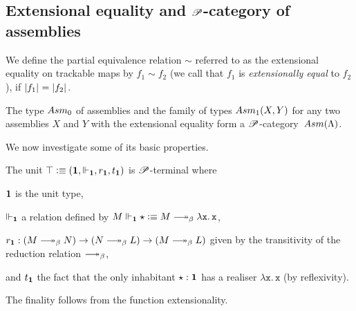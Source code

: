\documentclass[a4paper,UKenglish,numberwithinsect,cleveref,thm-restate]{lipics-v2021}
\numberwithin{equation}{section}
\theoremstyle{definition}
\theoremstyle{plain}
\begin{document}



\subsection{Extensional equality and \texorpdfstring{$\mathscr{P}$}{P}-category of assemblies}

We define the partial equivalence relation $\sim$ referred to as the extensional equality on trackable maps by $f_1 \sim f_2$ (we call that $f_1$ is \emph{extensionally equal} to $f_2$), if $\mathopen{}\left|f_1\right|_{}^{}\mathclose{} = \mathopen{}\left|f_2\right|_{}^{}\mathclose{}$.
\begin{proposition}
  The type $\Asm_0$ of assemblies and the family of types $\Asm_1(X, Y)$ for any two assemblies $X$ and $Y$ with the extensional equality form a $\mathscr{P}$-category~$\Asm(\Lambda)$.
\end{proposition}

We now investigate some of its basic properties.

\begin{example}
  The unit $\top \vcentcolon\equiv (\mathbf{1}, \Vdash_{\mathbf{1}}, r_{\mathbf{1}}, t_{\mathbf{1}})$ is $\mathscr{P}$-terminal where 
  \begin{romanenumerate}
    \item $\mathbf{1}$ is the unit type,  
    \item $\Vdash_{\mathbf{1}}$ a relation defined by $M \Vdash_{\Unit} \star \defeq M \reduce \mathtt{\lambda x.\, x}$, 
    \item $r_{\Unit}: (M \reduce N) \to (N \reduce L) \to (M \reduce L)$ given by the transitivity of the reduction relation $\reduce$,
    \item and $t_{\mathbf{1}}$ the fact that the only inhabitant $\star : \mathbf{1}$ has a realiser $\mathtt{\lambda x.\, x}$ (by reflexivity).
  \end{romanenumerate}
  The finality follows from the function extensionality.
\end{example}
\end{document}
